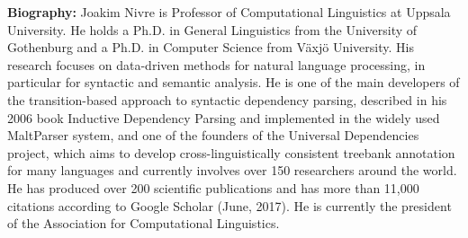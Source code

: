 \vfill
\noindent

{\bfseries Biography:} Joakim Nivre is Professor of Computational Linguistics at Uppsala University. He holds a Ph.D. in General Linguistics from the University of Gothenburg and a Ph.D. in Computer Science from Växjö University. His research focuses on data-driven methods for natural language processing, in particular for syntactic and semantic analysis. He is one of the main developers of the transition-based approach to syntactic dependency parsing, described in his 2006 book Inductive Dependency Parsing and implemented in the widely used MaltParser system, and one of the founders of the Universal Dependencies project, which aims to develop cross-linguistically consistent treebank annotation for many languages and currently involves over 150 researchers around the world. He has produced over 200 scientific publications and has more than 11,000 citations according to Google Scholar (June, 2017). He is currently the president of the Association for Computational Linguistics. 

\newpage
